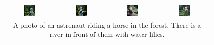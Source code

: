 \begin{figure}[ht!]
\begin{tabular}{cccc}
        \includegraphics[width=0.24\textwidth]{figures/scaling_comparison/astronaut_0.jpg} &
        \includegraphics[width=0.24\textwidth]{figures/scaling_comparison/astronaut_1.jpg} &
        \includegraphics[width=0.24\textwidth]{figures/scaling_comparison/astronaut_2.jpg} &
        \includegraphics[width=0.24\textwidth]{figures/scaling_comparison/astronaut_3.jpg}\vspace{1mm} \\
        \multicolumn{4}{c}{\small A photo of an astronaut riding a horse in the forest. There is a river in front of them with water lilies.}\vspace{3mm}\\


\end{tabular}
\end{figure}
